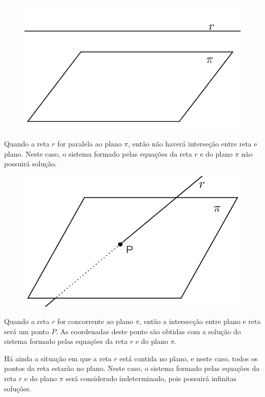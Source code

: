 \begin{multicols}{2}
\begin{figure}[H]
\centering
\includegraphics[scale=1]{analitica/imagens/plano-reta2.png}
\end{figure}

\noindent Quando a reta $r$ for paralela ao plano $\pi$, então não haverá interseção entre reta e plano. Neste caso, o sistema formado pelas equações da reta $r$ e do plano $\pi$ não possuirá solução.
\end{multicols}

\begin{multicols}{2}
\begin{figure}[H]
\centering
\includegraphics[scale=1]{analitica/imagens/plano-reta.png}
\end{figure}

\noindent Quando a reta $r$ for concorrente ao plano $\pi$, então a intersecção entre plano e reta será um ponto $P$. As coordenadas deste ponto são obtidas com a solução do sistema formado pelas equações da reta $r$ e do plano $\pi$.
\end{multicols}

Há ainda a situação em que a reta $r$ está contida no plano, e neste caso, todos os pontos da reta estarão no plano. Neste caso, o sistema formado pelas equações da reta $r$ e do plano $\pi$ será considerado indeterminado, pois possuirá infinitas soluções.